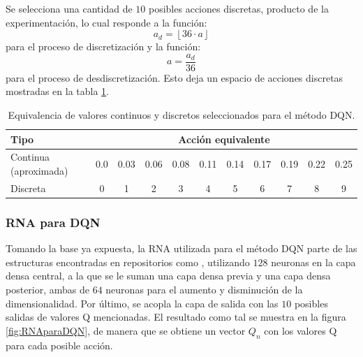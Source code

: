 Se selecciona una cantidad de $10$ posibles acciones discretas, producto de la experimentación, lo cual responde a la función:
\begin{equation}
a_d = \left\lfloor 36 \cdot a \right\rfloor
\end{equation}
para el proceso de discretización y la función:
\begin{equation}
a = \frac{a_d}{36}
\end{equation}
para el proceso de desdiscretización. Esto deja un espacio de acciones discretas mostradas en la tabla \ref{tab:accionesdis}.
\begin{table}[h]
\centering
\caption{Equivalencia de valores continuos y discretos seleccionados para el método DQN.}
\label{tab:accionesdis}
\begin{tabular}{|l|cccccccccc|}
\hline
\textbf{Tipo}         & \multicolumn{10}{c|}{\textbf{Acción equivalente}}                                                                                                                                                                                                               \\ \hline
Continua (aproximada) & \multicolumn{1}{c|}{0.0} & \multicolumn{1}{c|}{0.03} & \multicolumn{1}{c|}{0.06} & \multicolumn{1}{c|}{0.08} & \multicolumn{1}{c|}{0.11} & \multicolumn{1}{c|}{0.14} & \multicolumn{1}{c|}{0.17} & \multicolumn{1}{c|}{0.19} & \multicolumn{1}{c|}{0.22} & 0.25 \\ \hline
Discreta              & \multicolumn{1}{c|}{0}   & \multicolumn{1}{c|}{1}    & \multicolumn{1}{c|}{2}    & \multicolumn{1}{c|}{3}    & \multicolumn{1}{c|}{4}    & \multicolumn{1}{c|}{5}    & \multicolumn{1}{c|}{6}    & \multicolumn{1}{c|}{7}    & \multicolumn{1}{c|}{8}    & 9    \\ \hline
\end{tabular}
\end{table}

\subsubsection{RNA para DQN}

Tomando la base ya expuesta, la RNA utilizada para el método DQN parte de las estructuras encontradas en repositorios como \cite{PytorchDQN}, utilizando $128$ neuronas en la capa densa central, a la que se le suman una capa densa previa y una capa densa posterior, ambas de $64$ neuronas para el aumento y disminución de la dimensionalidad. Por último, se acopla la capa de salida con las $10$ posibles salidas de valores Q mencionadas. El resultado como tal se muestra en la figura \ref{fig:RNAparaDQN}, de manera que se obtiene un vector $Q_n$ con los valores Q para cada posible acción.

